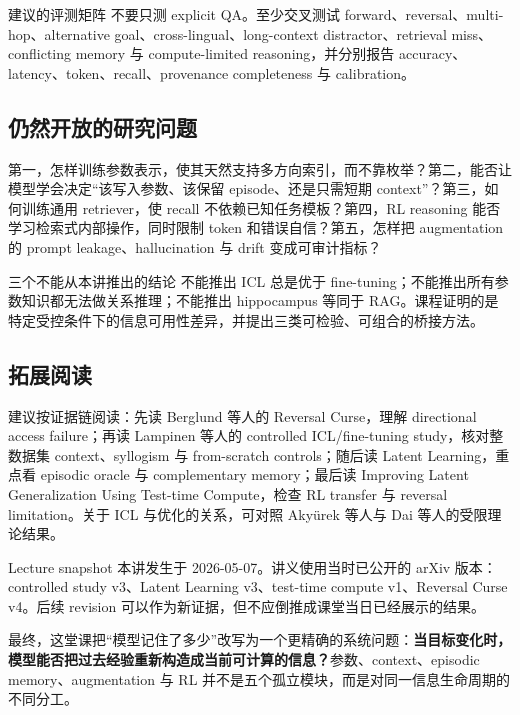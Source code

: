 \begin{knowledgebox}{建议的评测矩阵}
不要只测 explicit QA。至少交叉测试 forward、reversal、multi-hop、alternative goal、cross-lingual、long-context distractor、retrieval miss、conflicting memory 与 compute-limited reasoning，并分别报告 accuracy、latency、token、recall、provenance completeness 与 calibration。
\end{knowledgebox}

\subsection{仍然开放的研究问题}

第一，怎样训练参数表示，使其天然支持多方向索引，而不靠枚举？第二，能否让模型学会决定“该写入参数、该保留 episode、还是只需短期 context”？第三，如何训练通用 retriever，使 recall 不依赖已知任务模板？第四，RL reasoning 能否学习检索式内部操作，同时限制 token 和错误自信？第五，怎样把 augmentation 的 prompt leakage、hallucination 与 drift 变成可审计指标？

\begin{warningbox}{三个不能从本讲推出的结论}
不能推出 ICL 总是优于 fine-tuning；不能推出所有参数知识都无法做关系推理；不能推出 hippocampus 等同于 RAG。课程证明的是特定受控条件下的信息可用性差异，并提出三类可检验、可组合的桥接方法。
\end{warningbox}

\subsection{拓展阅读}

建议按证据链阅读：先读 Berglund 等人的 Reversal Curse，理解 directional access failure；再读 Lampinen 等人的 controlled ICL/fine-tuning study，核对整数据集 context、syllogism 与 from-scratch controls；随后读 Latent Learning，重点看 episodic oracle 与 complementary memory；最后读 Improving Latent Generalization Using Test-time Compute，检查 RL transfer 与 reversal limitation。关于 ICL 与优化的关系，可对照 Akyürek 等人与 Dai 等人的受限理论结果。

\begin{knowledgebox}{Lecture snapshot}
本讲发生于 2026-05-07。讲义使用当时已公开的 arXiv 版本：controlled study v3、Latent Learning v3、test-time compute v1、Reversal Curse v4。后续 revision 可以作为新证据，但不应倒推成课堂当日已经展示的结果。
\end{knowledgebox}

最终，这堂课把“模型记住了多少”改写为一个更精确的系统问题：\textbf{当目标变化时，模型能否把过去经验重新构造成当前可计算的信息？}参数、context、episodic memory、augmentation 与 RL 并不是五个孤立模块，而是对同一信息生命周期的不同分工。


